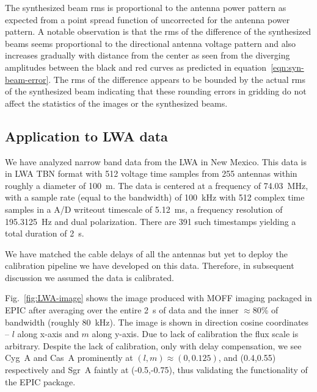 \documentclass[a4paper,fleqn,usenatbib]{../mnras}
\begin{document}
The synthesized beam rms is proportional to the antenna power pattern as 
expected from a point spread function of uncorrected for the antenna power 
pattern. A notable observation is that the rms of the difference of
the synthesized beams seems proportional to the directional antenna voltage
pattern and also increases gradually with distance from the center as seen 
from the diverging amplitudes between the black and red curves as predicted
in equation~\ref{eqn:syn-beam-error}. The rms of the difference appears to 
be bounded by the actual rms of the synthesized beam indicating that these
rounding errors in gridding do not affect the statistics of the images or
the synthesized beams.

\subsection{Application to LWA data}\label{sec:LWA-data}

We have analyzed narrow band data from the LWA in New Mexico. This data is  
in LWA TBN format with 512 voltage time samples from 255 antennas within 
roughly a diameter of 100~m. The data is centered at a frequency of 74.03~MHz,
with a sample rate (equal to the bandwidth) of 100~kHz with 512 complex time 
samples in a A/D writeout timescale of 5.12~ms, a frequency resolution of 
195.3125~Hz and dual polarization. There are 391 such timestamps yielding a
total duration of 2~s. 

We have matched the cable delays of all the antennas but yet to deploy the 
calibration pipeline we have developed on this data. Therefore, in 
subsequent discussion we assumed the data is calibrated. 

Fig.~\ref{fig:LWA-image} shows the image produced with MOFF imaging 
packaged in EPIC after averaging over the entire 2~s of data and the inner
$\approx 80$\% of bandwidth (roughly 80~kHz). The image is shown in direction 
cosine coordinates -- $l$ along x-axis and $m$ along y-axis. Due to lack of
calibration the flux scale is arbitrary. Despite the lack of calibration,
only with delay compensation, we see Cyg~A and Cas~A prominently at
$(l,m)\approx (0, 0.125)$, and (0.4,0.55) respectively and Sgr~A faintly at
(-0.5,-0.75), thus validating the functionality of the EPIC package.
\end{document}
